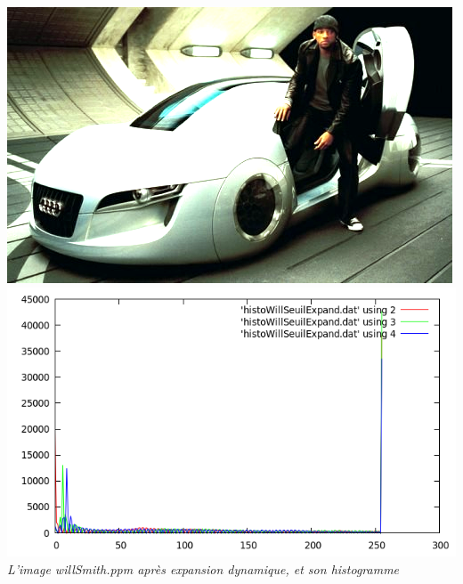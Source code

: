 \documentclass[a4paper,11pt]{article}
\begin{document}
\begin{center}
\includegraphics[scale=0.25]{willseuilexpand.png}
\includegraphics[scale=0.25]{histoWillSeuilExpand.png}\\
\textit{L'image willSmith.ppm après expansion dynamique, et son histogramme}
\end{center}
\vspace*{0.5cm}
\end{document}
